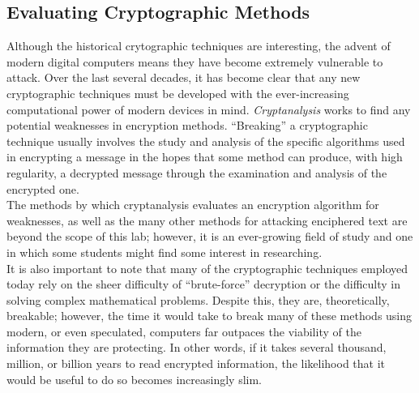 		\subsection{Evaluating Cryptographic Methods}
			Although the historical crytographic techniques are interesting, the advent of modern digital computers means they have become extremely vulnerable to attack. Over the last several decades, it has become clear that any new cryptographic techniques must be developed with the ever-increasing computational power of modern devices in mind. \emph{Cryptanalysis} works to find any potential weaknesses in encryption methods. ``Breaking'' a cryptographic technique usually involves the study and analysis of the specific algorithms used in encrypting a message in the hopes that some method can produce, with high regularity, a decrypted message through the examination and analysis of the encrypted one.\\[\baselineskip]
			The methods by which cryptanalysis evaluates an encryption algorithm for weaknesses, as well as the many other methods for attacking enciphered text are beyond the scope of this lab; however, it is an ever-growing field of study and one in which some students might find some interest in researching.\\[\baselineskip]
			It is also important to note that many of the cryptographic techniques employed today rely on the sheer difficulty of ``brute-force'' decryption or the difficulty in solving complex mathematical problems. Despite this, they are, theoretically, breakable; however, the time it would take to break many of these methods using modern, or even speculated, computers far outpaces the viability of the information they are protecting. In other words, if it takes several thousand, million, or billion years to read encrypted information, the likelihood that it would be useful to do so becomes increasingly slim.

	\pagebreak

